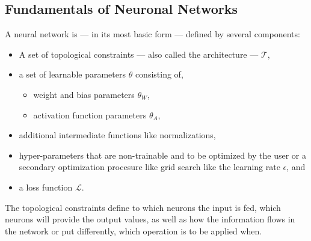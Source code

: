 \subsection{Fundamentals of Neuronal Networks}
A neural network is --- in its most basic form --- defined by several components:
\begin{itemize}
 \item A set of topological constraints --- also called the architecture --- $\mathcal{T}$,
 \item a set of learnable parameters $\theta$ consisting of,
 \begin{itemize}
  \item weight and bias parameters $\theta_W$,
  \item activation function parameters $\theta_A$,
 \end{itemize}
 \item additional intermediate functions like normalizations,
 \item hyper-parameters that are non-trainable and to be optimized by the user or a secondary optimization procesure like grid search like the learning rate $\epsilon$, and
 \item a loss function $\mathcal{L}$.
\end{itemize}
The topological constraints define to which neurons the input is fed, which neurons will provide the output values, as well as how the information flows in the network or put differently, which operation is to be applied when.

